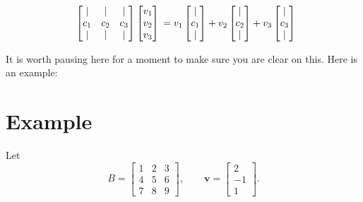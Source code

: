 \documentclass[11pt]{article}
\begin{document}
\[
\begin{array}{c@{\,}c}
\begin{bmatrix}
| & | & | \\
c_1 & c_2 & c_3 \\
| & | & | \\
\end{bmatrix}
\begin{bmatrix}
v_1 \\
v_2 \\
v_3 \\
\end{bmatrix}
\end{array}
=
v_1 \begin{bmatrix}
| \\
c_1 \\
| \\
\end{bmatrix}
+
v_2 \begin{bmatrix}
| \\
c_2 \\
| \\
\end{bmatrix}
+
v_3 \begin{bmatrix}
| \\
c_3 \\
| \\
\end{bmatrix}
\]

It is worth pausing here for a moment to make sure you are clear on this. Here is an example:

\section*{Example}

Let
\[
B = \begin{bmatrix}
1 & 2 & 3 \\
4 & 5 & 6 \\
7 & 8 & 9
\end{bmatrix}, \qquad
\mathbf{v} = \begin{bmatrix} 2 \\ -1 \\ 1 \end{bmatrix}.
\]
\end{document}
